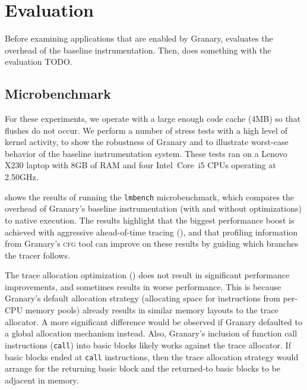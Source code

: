 \documentclass[preprint]{sigplanconf}
\newcommand{\toolname}[1]{{\scshape #1}}
\begin{document}
\section{Evaluation}\label{sec:eval}

Before examining applications that are enabled by Granary,  evaluates the overhead of the baseline instrumentation. Then,  does something with the evaluation TODO.

\subsection{Microbenchmark}\label{sec:microbench}
For these experiments, we operate with a large enough code cache (\texttildelow 4MB) so that flushes do not occur. We perform a number of stress tests with a high level of kernel activity, to show the robustness of Granary and to illustrate worst-case behavior of the baseline instrumentation system. These tests ran on a Lenovo X230 laptop with 8GB of RAM and four Intel\textregistered\ Core\texttrademark\ i5 CPUs operating at 2.50GHz.

 shows the results of running the \texttt{lmbench} microbenchmark, which compares the overhead of Granary's baseline instrumentation (with and without optimizations) to native execution. The results highlight that the biggest performance boost is achieved with aggressive ahead-of-time tracing (), and that profiling information from Granary's \toolname{cfg} tool can improve on these results by guiding which branches the tracer follows.

The trace allocation optimization () does not result in significant performance improvements, and sometimes results in worse performance. This is because Granary's default allocation strategy (allocating space for instructions from per-CPU memory pools) already results in similar memory layouts to the trace allocator. A more significant difference would  be observed if Granary defaulted to a global allocation mechanism instead. Also, Granary's inclusion of function call instructions (\texttt{call}) into basic blocks likely works against the trace allocator. If basic blocks ended at \texttt{call} instructions, then the trace allocation strategy would arrange for the returning basic block and the returned-to basic blocks to be adjacent in memory.

\end{document}
